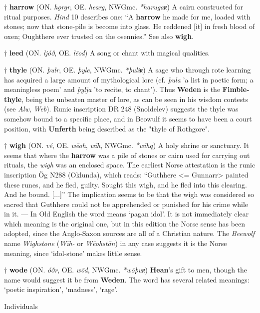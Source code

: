 † \textbf{harrow} (ON. \emph{hǫrgr}, OE. \emph{hearg}, NWGmc. \emph{*harugaʀ})
 A cairn constructed for ritual purposes. \emph{Hind} 10 describes one: “A \textbf{harrow} he made for me, loaded with stones; now that stone-pile is become into glass. He reddened [it] in fresh blood of oxen; Oughthere ever trusted on the osennies.” See also \textbf{wigh}.

† \textbf{leed} (ON. \emph{ljóð}, OE. \emph{lēod})
 A song or chant with magical qualities.

† \textbf{thyle} (ON. \emph{þulr}, OE. \emph{þyle}, NWGmc. \emph{*þuliʀ})
 A sage who through rote learning has acquired a large amount of mythological lore (cf. \emph{þula} 'a list in poetic form; a meaningless poem' and \emph{þylja} 'to recite, to chant'). Thus \textbf{Weden} is the \textbf{Fimble-thyle}, being the unbeaten master of lore, as can be seen in his wisdom contests (see \emph{Alw}, \emph{Web}). Runic inscription DR 248 (Snoldelev) suggests the thyle was somehow bound to a specific place, and in Beowulf it seems to have been a court position, with \textbf{Unferth} being described as the "thyle of Rothgore".

† \textbf{wigh} (ON. \emph{vé}, OE. \emph{wēoh}, \emph{wīh}, NWGmc. \emph{*wīhą})
 A holy shrine or sanctuary. It seems that where the \textbf{harrow} was a pile of stones or cairn used for carrying out rituals, the \emph{wigh} was an enclosed space. The earliest Norse attestation is the runic inscription Ög N288 (Oklunda), which reads: “Guthhere <= Gunnarr> painted these runes, and he fled, guilty. Sought this wigh, and he fled into this clearing. And he bound. [...]” The implication seems to be that the wigh was considered so sacred that Guthhere could not be apprehended or punished for his crime while in it. — In Old English the word means ‘pagan idol’. It is not immediately clear which meaning is the original one, but in this edition the Norse sense has been adopted, since the Anglo-Saxon sources are all of a Christian nature. The \emph{Beewolf} name \emph{Wighstone} (\emph{Wīh-} or \emph{Wēohstān}) in any case suggests it is the Norse meaning, since ‘idol-stone’ makes little sense.

† \textbf{wode} (ON. \emph{óðr}, OE. \emph{wōd}, NWGmc. \emph{*wōþuʀ})
 \textbf{Hean}'s gift to men, though the name would suggest it be from \textbf{Weden}. The word has several related meanings: ‘poetic inspiration’, ‘madness’, ‘rage’.



Individuals


